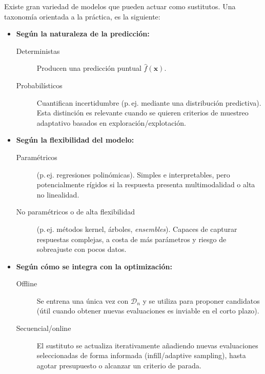\medskip
\noindent Existe gran variedad de modelos que pueden actuar como sustitutos. Una taxonomía orientada a la práctica, es la siguiente:
\begin{itemize}
  \item \textbf{Según la naturaleza de la predicción:}
  \begin{description}
    \item [Deterministas] Producen una predicción puntual $\hat{f}(\bm{x})$.
    \item [Probabilísticos] Cuantifican incertidumbre (p.\,ej. mediante una
    distribución predictiva). Esta distinción es relevante cuando se quieren criterios de
    muestreo adaptativo basados en exploración/explotación. \cite{forrester2008engineering,jiang2020surrogate}
  \end{description}

  \item \textbf{Según la flexibilidad del modelo:}
  \begin{description}
    \item [Paramétricos] (p.\,ej. regresiones polinómicas). Simples e interpretables, pero
    potencialmente rígidos si la respuesta presenta multimodalidad o alta no linealidad.
    \item [No paramétricos o de alta flexibilidad] (p.\,ej. métodos kernel, árboles, \emph{ensembles}).
    Capaces de capturar respuestas complejas, a costa de más parámetros y riesgo de sobreajuste
    con pocos datos. \cite{forrester2008engineering}
  \end{description}

  \item \textbf{Según cómo se integra con la optimización:}
  \begin{description}
    \item[Offline] Se entrena una única vez con $\mathcal{D}_n$ y se utiliza para proponer
    candidatos (útil cuando obtener nuevas evaluaciones es inviable en el corto plazo).
    \item[Secuencial/online] El sustituto se actualiza iterativamente añadiendo nuevas
    evaluaciones seleccionadas de forma informada (infill/adaptive sampling), hasta agotar presupuesto
    o alcanzar un criterio de parada. \cite{forrester2008engineering,jiang2020surrogate}
  \end{description}
\end{itemize}

